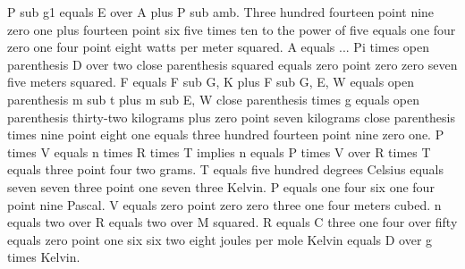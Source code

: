 P sub g1 equals E over A plus P sub amb. Three hundred fourteen point nine zero one plus fourteen point six five times ten to the power of five equals one four zero one four point eight watts per meter squared. A equals ... Pi times open parenthesis D over two close parenthesis squared equals zero point zero zero seven five meters squared. F equals F sub G, K plus F sub G, E, W equals open parenthesis m sub t plus m sub E, W close parenthesis times g equals open parenthesis thirty-two kilograms plus zero point seven kilograms close parenthesis times nine point eight one equals three hundred fourteen point nine zero one. P times V equals n times R times T implies n equals P times V over R times T equals three point four two grams. T equals five hundred degrees Celsius equals seven seven three point one seven three Kelvin. P equals one four six one four point nine Pascal. V equals zero point zero zero three one four meters cubed. n equals two over R equals two over M squared. R equals C three one four over fifty equals zero point one six six two eight joules per mole Kelvin equals D over g times Kelvin.